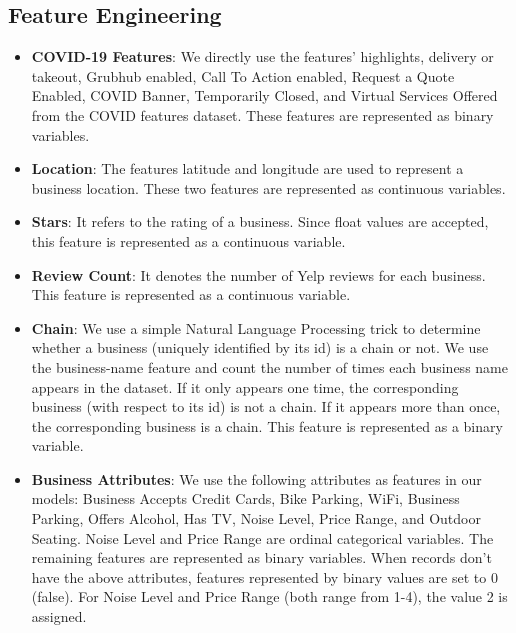 \documentclass{article}
\begin{document}
\subsection{Feature Engineering}

\begin{itemize}[leftmargin=*]
\item \textbf{COVID-19 Features}: We directly use the features' highlights,	delivery or takeout, Grubhub enabled, Call To Action enabled, Request a Quote Enabled, COVID Banner, Temporarily Closed, and Virtual Services Offered from the COVID features dataset. These features are represented as binary variables. 

\item \textbf{Location}: The features latitude and longitude are used to represent a business location. These two features are represented as continuous variables. 

\item \textbf{Stars}: It refers to the rating of a business. Since float values are accepted, this feature is represented as a continuous variable.

\item \textbf{Review Count}: It denotes the number of Yelp reviews for each business.  This feature is represented as a continuous variable. 

\item \textbf{Chain}: We use a simple Natural Language Processing trick to determine whether a business (uniquely identified by its id) is a chain or not. We use the business-name feature and count the number of times each business name appears in the dataset. If it only appears one time, the corresponding business (with respect to its id) is not a chain. If it appears more than once, the corresponding business is a chain. This feature is represented as a binary variable.

\item \textbf{Business Attributes}: We use the following attributes as features in our models: Business Accepts Credit Cards, Bike Parking, WiFi, Business Parking, Offers Alcohol, Has TV, Noise Level, Price Range, and Outdoor Seating. Noise Level and Price Range are ordinal categorical variables. The remaining features are represented as binary variables. When records don't have the above attributes, features represented by binary values are set to 0 (false). For Noise Level and Price Range (both range from 1-4), the value 2 is assigned. 


\end{itemize}
\end{document}
